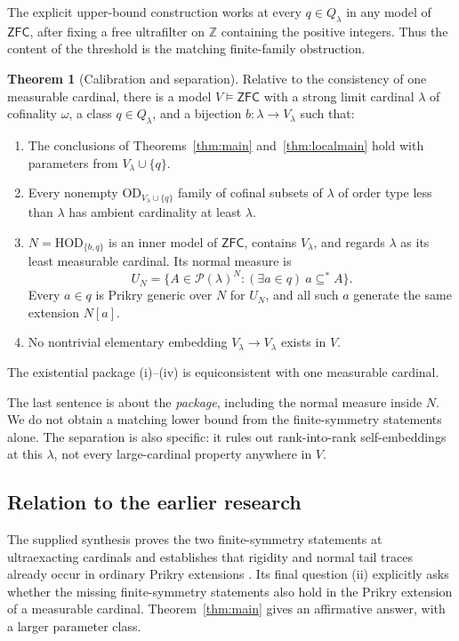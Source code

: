 \documentclass[11pt,letterpaper]{article}
\theoremstyle{definition}
\newtheorem{theorem}[definition]{Theorem}
\numberwithin{equation}{section}
\newcommand{\ZFC}{\mathsf{ZFC}}
\newcommand{\HOD}{\mathrm{HOD}}
\newcommand{\OD}{\mathrm{OD}}
\begin{document}
The explicit upper-bound construction works at every $q\in Q_\lambda$ in any model of $\ZFC$, after fixing a free ultrafilter on $\mathbb Z$ containing the positive integers. Thus the content of the threshold is the matching finite-family obstruction.

\begin{theorem}[Calibration and separation]\label{thm:calibrationintro}
Relative to the consistency of one measurable cardinal, there is a model $V\models\ZFC$ with a strong limit cardinal $\lambda$ of cofinality $\omega$, a class $q\in Q_\lambda$, and a bijection $b:\lambda\to V_\lambda$ such that:
\begin{enumerate}[label=(\roman*)]
\item The conclusions of Theorems~\ref{thm:main} and~\ref{thm:localmain} hold with parameters from $V_\lambda\cup\{q\}$.
\item Every nonempty $\OD_{V_\lambda\cup\{q\}}$ family of cofinal subsets of $\lambda$ of order type less than $\lambda$ has ambient cardinality at least $\lambda$.
\item $N=\HOD_{\{b,q\}}$ is an inner model of $\ZFC$, contains $V_\lambda$, and regards $\lambda$ as its least measurable cardinal. Its normal measure is
\[
 U_N=\{A\in\mathcal P(\lambda)^N:
                  (\exists a\in q)\ a\subseteq^*A\}.
\]
Every $a\in q$ is Prikry generic over $N$ for $U_N$, and all such $a$ generate the same extension $N[a]$.
\item No nontrivial elementary embedding $V_\lambda\to V_\lambda$ exists in $V$.
\end{enumerate}
The existential package (i)--(iv) is equiconsistent with one measurable cardinal.
\end{theorem}

The last sentence is about the \emph{package}, including the normal measure inside $N$. We do not obtain a matching lower bound from the finite-symmetry statements alone. The separation is also specific: it rules out rank-into-rank self-embeddings at this $\lambda$, not every large-cardinal property anywhere in $V$.

\subsection{Relation to the earlier research}

The supplied synthesis proves the two finite-symmetry statements at ultraexacting cardinals and establishes that rigidity and normal tail traces already occur in ordinary Prikry extensions \cite[sections 9, 12--13]{synthesis}. Its final question (ii) explicitly asks whether the missing finite-symmetry statements also hold in the Prikry extension of a measurable cardinal. Theorem~\ref{thm:main} gives an affirmative answer, with a larger parameter class.
\end{document}
